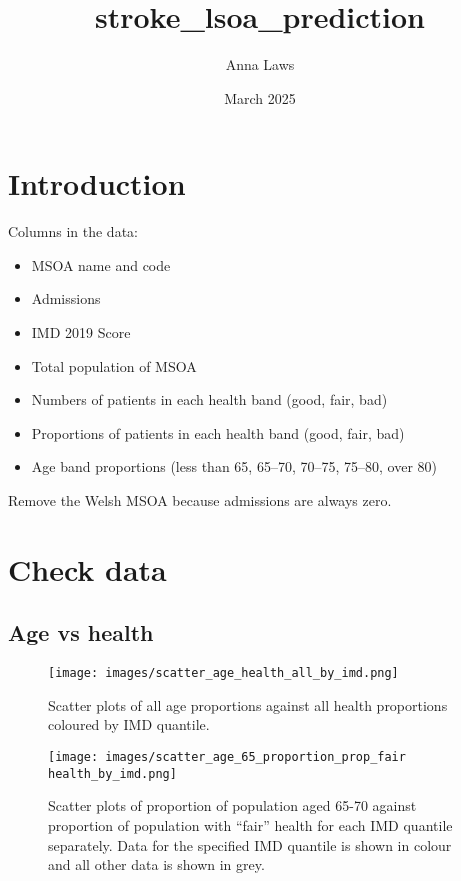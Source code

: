\documentclass[12pt]{extarticle}
\title{stroke\_lsoa\_prediction}
\author{Anna Laws}
\date{March 2025}
\begin{document}
\maketitle

\section{Introduction}

Columns in the data:

\begin{itemize}
    \item MSOA name and code
    \item Admissions
    \item IMD 2019 Score
    \item Total population of MSOA
    \item Numbers of patients in each health band (good, fair, bad)
    \item Proportions of patients in each health band (good, fair, bad)
    \item Age band proportions (less than 65, 65--70, 70--75, 75--80, over 80)
\end{itemize}

Remove the Welsh MSOA because admissions are always zero.


\section{Check data}
\subsection{Age vs health}

\begin{figure}
    \centering
    \texttt{[image: images/scatter\_age\_health\_all\_by\_imd.png]}
    \caption{Scatter plots of all age proportions against all health proportions coloured by IMD quantile.}
    \label{fig:data_all_age_health_by_imd}
\end{figure}


\begin{figure}
    \centering
    \texttt{[image: images/scatter\_age\_65\_proportion\_prop\_fair health\_by\_imd.png]}
    \caption{Scatter plots of proportion of population aged 65-70 against proportion of population with ``fair'' health for each IMD quantile separately. Data for the specified IMD quantile is shown in colour and all other data is shown in grey.}
    \label{fig:data_example_age_health_by_imd}
\end{figure}
\end{document}
